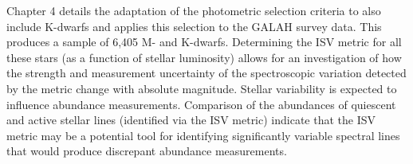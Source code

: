 Chapter 4 details the adaptation of the photometric selection criteria to also include K-dwarfs and applies this selection to the GALAH survey data. This produces a sample of 6,405 M- and K-dwarfs. Determining the ISV metric for all these stars (as a function of stellar luminosity) allows for an investigation of how the strength and measurement uncertainty of the spectroscopic variation detected by the metric change with absolute magnitude. Stellar variability is expected to influence abundance measurements. Comparison of the abundances of quiescent and active stellar lines (identified via the ISV metric) indicate that the ISV metric may be a potential tool for identifying significantly variable spectral lines that would produce discrepant abundance measurements.\\

